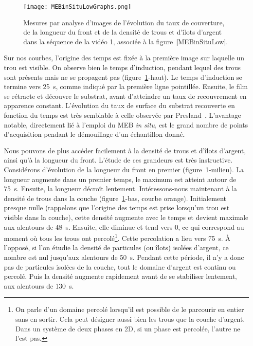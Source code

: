\begin{figure}[!htb]
	\centering
	\texttt{[image: MEBinSituLowGraphs.png]}
	\caption{Mesures par analyse d'images de l'évolution du taux de couverture, de la longueur du front et de la densité de trous et d'îlots d'argent dans la séquence de la vidéo 1, associée à la figure~\ref{MEBinSituLow}.}
	\label{MEBinSituLowGraphs}
\end{figure}

Sur nos courbes, l'origine des temps est fixée à la première image sur laquelle un trou est visible. On observe bien le temps d'induction, pendant lequel des trous sont présents mais ne se propagent pas (figure~\ref{MEBinSituLowGraphs}-haut). Le temps d'induction se termine vers 25~s, comme indiqué par la première ligne pointillée. Ensuite, le film se rétracte et découvre le substrat, avant d'atteindre un taux de recouvrement en apparence constant. L'évolution du taux de surface du substrat recouverte en fonction du temps est très semblable à celle observée par Presland~\cite{presland1972hillock}. L'avantage notable, directement lié à l'emploi du MEB\textit{ in situ}, est le grand nombre de points d'acquisition pendant le démouillage d'un échantillon donné.\par 
Nous pouvons de plus accéder facilement à la densité de trous et d'îlots d'argent, ainsi qu'à la longueur du front. L'étude de ces grandeurs est très instructive. Considérons d'évolution de la longueur du front en premier (figure~\ref{MEBinSituLowGraphs}-milieu). La longueur augmente dans un premier temps, le maximum est atteint autour de 75~s. Ensuite, la longueur décroît lentement. Intéressons-nous maintenant à la densité de trous dans la couche (figure~\ref{MEBinSituLowGraphs}-bas, courbe orange). Initialement presque nulle (rappelons que l'origine des temps est prise lorsqu'un trou est visible dans la couche), cette densité augmente avec le temps et devient maximale aux alentours de 48~s. Ensuite, elle diminue et tend vers 0, ce qui correspond au moment où tous les trous ont percolé\footnote{On parle d'un domaine percolé lorsqu'il est possible de le parcourir en entier sans en sortir. Cela peut désigner aussi bien les trous que la couche d'argent. Dans un système de deux phases en 2D, si un phase est percolée, l'autre ne l'est pas.}. Cette percolation a lieu vers 75~s. À l'opposé, si l'on étudie la densité de particules (ou îlots) isolées d'argent, ce nombre est nul jusqu'aux alentours de 50~s. Pendant cette période, il n'y a donc pas de particules isolées de la couche, tout le domaine d'argent est continu ou percolé. Puis la densité augmente rapidement avant de se stabiliser lentement, aux alentours de 130~s.\par
